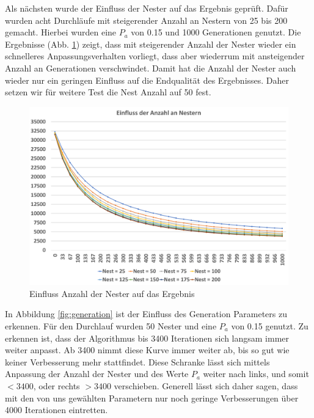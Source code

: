 \documentclass[conference]{IEEEtran}
\begin{document}
      Als nächsten wurde der Einfluss der Nester auf das Ergebnis geprüft. Dafür wurden acht Durchläufe mit steigerender Anzahl an Nestern von 25 bis 200 
      gemacht. Hierbei wurden eine $P_a$ von 0.15 und 1000 Generationen genutzt. Die Ergebnisse (Abb. \ref{fig:nests}) zeigt, dass mit steigerender Anzahl der Nester wieder
      ein schnelleres Anpassungsverhalten vorliegt, dass aber wiederrum mit ansteigender Anzahl an Generationen verschwindet. Damit hat die Anzahl der Nester auch wieder
      nur ein geringen Einfluss auf die Endqualität des Ergebnisses. Daher setzen wir für weitere Test die Nest Anzahl auf 50 fest. 

      \begin{figure}[H]
        \centering
        \includegraphics[width=0.8\linewidth]{Nester.png}
        \caption{Einfluss Anzahl der Nester auf das Ergebnis}
        \label{fig:nests}
      \end{figure}

      In Abbildung \ref{fig:generation} ist der Einfluss des Generation Parameters zu erkennen. Für den Durchlauf wurden 50 Nester und eine $P_a$ von 0.15 genutzt. 
      Zu erkennen ist, dass der Algorithmus bis 3400 Iterationen sich langsam immer weiter anpasst. Ab 3400 nimmt diese Kurve immer weiter ab, bis so gut wie keiner Verbesserung
      mehr stattfindet. Diese Schranke lässt sich mittels Anpassung der Anzahl der Nester und des Werte $P_a$ weiter nach links, und somit $<3400$, oder rechts $>3400$ verschieben.
      Generell lässt sich daher sagen, dass mit den von uns gewählten Parametern nur noch geringe Verbesserungen über 4000 Iterationen eintretten.
\end{document}
